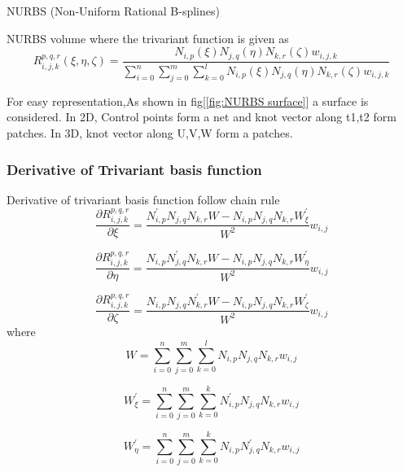 \documentclass[a4paper,12pt,times]{article}
\begin{document}
\begin{section}{NURBS (Non-Uniform Rational B-splines) }
\begin{subsection}{NURBS volume}
where the trivariant function is given as
\begin{equation}\label{Trivariant function}
R_{i, j, k}^{p, q, r}(\xi, \eta, \zeta)=\frac{N_{i, p}(\xi) N_{j, q}(\eta) N_{k, r}(\zeta) w_{i, j, k}}{\sum_{i=0}^{n} \sum_{j=0}^{m} \sum_{k=0}^{l} N_{i, p}(\xi) N_{j, q}(\eta) N_{k, r}(\zeta) w_{i, j, k}}
\end{equation}

For easy representation,As shown in fig[\ref{fig:NURBS surface}] a surface is considered. In 2D, Control points form a net and knot vector along t1,t2 form patches. In 3D, knot vector along U,V,W form a patches.

\subsubsection{Derivative of Trivariant basis function}
Derivative of trivariant basis function follow chain rule
\begin{equation}
\frac{\partial R_{i, j,k}^{p, q,r}}{\partial \xi}=\frac{N_{i, p}^{\prime} N_{j, q}N_{k, r} W-N_{i, p} N_{j, q} N_{k, r}W_{\xi}^{\prime}}{W^{2}} w_{i, j}
\end{equation}

\begin{equation}
\frac{\partial R_{i, j,k}^{p, q,r}}{\partial \eta}=\frac{N_{i, p} N_{j, q}^{\prime}N_{k, r} W-N_{i, p} N_{j, q} N_{k, r}W_{\eta}^{\prime}}{W^{2}} w_{i, j}
\end{equation}


\begin{equation}
\frac{\partial R_{i, j,k}^{p, q,r}}{\partial \zeta}=\frac{N_{i, p} N_{j, q}N_{k, r}^{\prime} W-N_{i, p} N_{j, q} N_{k, r}W_{\zeta}^{\prime}}{W^{2}} w_{i, j}
\end{equation}
where
\begin{equation}
W=\sum_{i=0}^{n} \sum_{j=0}^{m}\sum_{k=0}^{l} N_{i, p} N_{j, q} N_{k, r}w_{i, j}
\end{equation}

\begin{equation}
W_{\xi}^{\prime}=\sum_{i=0}^{n} \sum_{j=0}^{m} \sum_{k=0}^{k} N_{i, p}^{\prime} N_{j, q} N_{k, r} w_{i, j}
\end{equation}

\begin{equation}
W_{\eta}^{\prime}=\sum_{i=0}^{n} \sum_{j=0}^{m} \sum_{k=0}^{k} N_{i, p} N_{j, q}^{\prime} N_{k, r} w_{i, j}
\end{equation}


\end{subsection}
\end{section}
\end{document}

